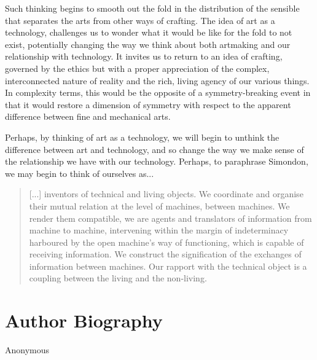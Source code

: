 \documentclass[letterpaper]{article}
\begin{document}
    Such thinking begins to smooth out the fold in the distribution of the sensible that separates the arts from other ways of crafting. The idea of art as a technology, challenges us to wonder what it would be like for the fold to not exist, potentially changing the way we think about both artmaking and our relationship with technology. It invites us to return to an idea of crafting, governed by the ethics but with a proper appreciation of the complex, interconnected nature of reality and the rich, living agency of our various things. In complexity terms, this would be the opposite of a symmetry-breaking event in that it would restore a dimension of symmetry with respect to the apparent difference between fine and mechanical arts.
        
    Perhaps, by thinking of art as a technology, we will begin to unthink the difference between art and technology, and so change the way we make sense of the relationship we have with our technology. Perhaps, to paraphrase Simondon, we may begin to think of ourselves as... 
    
    \begin{quote}
        [...] inventors of technical and living objects. We coordinate and organise their mutual relation at the level of machines, between machines. We render them compatible, we are agents and translators of information from machine to machine, intervening within the margin of indeterminacy harboured by the open machine's way of functioning, which is capable of receiving information. We construct the signification of the exchanges of information between machines. Our rapport with the technical object is a coupling between the living and the non-living. \citep[p.xvi]{SimondonOnThMdOfExstncOfTechnclObjcts1980}
    \end{quote}




\section{Author Biography}

Anonymous 
\end{document}
